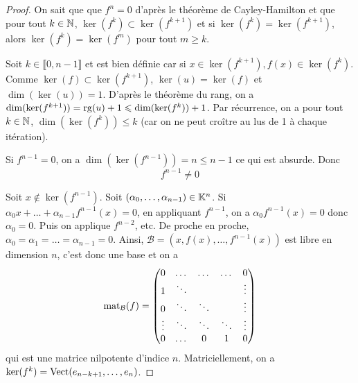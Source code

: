 \documentclass[12pt]{article}
\begin{document}
\begin{proof}
	On sait que que $f^{n}=0$ d'après le théorème de Cayley-Hamilton et que pour tout $k\in\mathbb{N}$, $\ker(f^{k})\subset\ker(f^{k+1})$ et si $\ker(f^{k})=\ker(f^{k+1})$, alors $\ker(f^{k})=\ker(f^{m})$ pour tout $m\geqslant k$.

	Soit $k\in\llbracket0,n-1\rrbracket$ et  est bien définie car si $x\in\ker(f^{k+1}),f(x)\in\ker(f^{k})$. Comme $\ker(f)\subset\ker(f^{k+1})$, $\ker(u)=\ker(f)$ et $\dim(\ker(u))=1$. D'après le théorème du rang, on a $\dim(\ker(f^{k+1}))=\operatorname{rg}(u)+1\leqslant\dim(\ker(f^{k}))+1$. Par récurrence, on a pour tout $k\in\mathbb{N}$, $\dim(\ker(f^{k}))\leqslant k$ (car on ne peut croître au lus de 1 à chaque itération).

	Si $f^{n-1}=0$, on a $\dim(\ker(f^{n-1}))=n\leqslant n-1$ ce qui est absurde. Donc 
	\begin{equation}
		\boxed{f^{n-1}\neq0}
	\end{equation}

	Soit $x\notin\ker(f^{n-1})$. Soit $(\alpha_{0},\dots,\alpha_{n-1})\in\mathbb{K}^{n}$. Si $\alpha_{0}x+\dots+\alpha_{n-1}f^{n-1}(x)=0$, en appliquant $f^{n-1}$, on a $\alpha_{0}f^{n-1}(x)=0$ donc $\alpha_{0}=0$. Puis on applique $f^{n-2}$, etc. De proche en proche, $\alpha_{0}=\alpha_{1}=\dots=\alpha_{n-1}=0$. Ainsi, $\mathcal{B}=(x,f(x),\dots,f^{n-1}(x))$ est libre en dimension $n$, c'est donc une base et on a 
	\begin{equation}
		\operatorname{mat}_{\mathcal{B}}(f)=
		\begin{pmatrix}
			0&\dots&\dots&\dots&0\\
			1&\ddots&&&\vdots\\
			0&\ddots&\ddots&&\vdots\\
			\vdots&\ddots&\ddots&\ddots&\vdots\\
			0&\dots&0&1&0
		\end{pmatrix}
	\end{equation}
	qui est une matrice nilpotente d'indice $n$. Matriciellement, on a $\ker(f^{k})=\operatorname{Vect}(e_{n-k+1},\dots,e_{n})$.
\end{proof}
\end{document}
